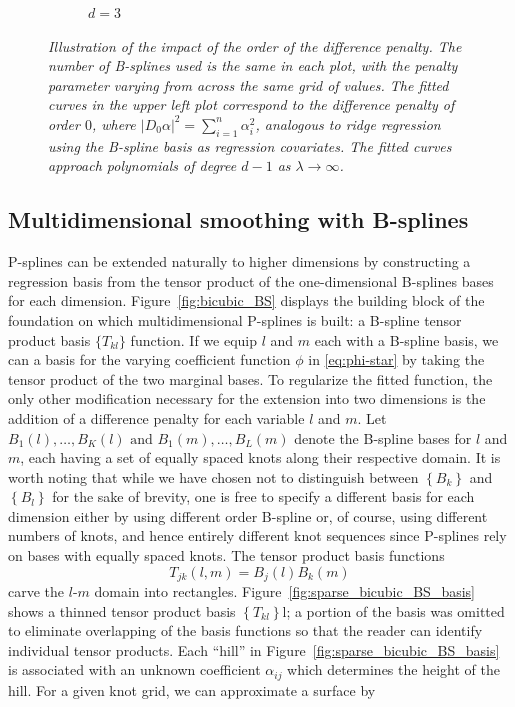 \documentclass[12pt]{article}
\theoremstyle{definition}
\begin{document}
\begin{figure}[H]
\begin{subfigure}{.5\textwidth}
\caption{$d=3$}
\end{subfigure}
\caption{\textit{Illustration of the impact of the order of the difference penalty. The number of B-splines used is the same in each plot, with the penalty parameter varying from across the same grid of values. The fitted curves in the upper left plot correspond to the difference penalty of order $0$, where $\vert D_0 \alpha \vert^2 = \sum_{i=1}^n \alpha_i^2$, analogous to ridge regression using the B-spline basis as regression covariates. The fitted curves approach polynomials of degree $d-1$ as $\lambda \rightarrow \infty$.}}
\label{fig:PS_penalty_section_figure_6}
\end{figure}


\subsection{Multidimensional smoothing with B-splines} \label{subsection:tensor-product-pspline-models}

P-splines can be extended naturally to higher dimensions by constructing a regression basis from the tensor product of the one-dimensional B-splines bases for each dimension. Figure~\ref{fig:bicubic_BS} displays the building block of the foundation on which multidimensional P-splines is built: a B-spline tensor product basis $\big\{ T_{kl}\big\}$ function.  If we equip $l$ and $m$ each with a B-spline basis, we can a basis for the varying coefficient function $\phi$ in \ref{eq:phi-star} by taking the tensor product of the two marginal bases. To regularize the fitted function, the only other modification necessary for the extension into two dimensions is the addition of a difference penalty for each variable $l$ and $m$. Let $B_{1}\left(l\right),\dots, B_{K}\left(l\right)  \mbox{ and } B_{1}\left(m\right),\dots, B_{L}\left(m\right)$  denote the B-spline bases for $l$ and $m$, each having a set of equally spaced knots along their respective domain. It is worth noting that while we have chosen not to distinguish between $\left\{ B_k \right\}$ and $\left\{ {B}_l \right\}$ for the sake of brevity, one is free to specify a different basis for each dimension either by using different order B-spline or, of course, using different numbers of knots, and hence entirely different knot sequences since P-splines rely on bases with equally spaced knots. The tensor product basis functions
\begin{equation*}
T_{jk}\left(l,m\right) = B_j\left(l\right){B}_k\left(m\right)
\end{equation*}
\noindent
 carve the $l$-$m$ domain into rectangles.  Figure~\ref{fig:sparse_bicubic_BS_basis} shows a thinned tensor product basis $\left\{ T_{kl} \right\}$l; a portion of the basis was omitted to eliminate overlapping of the basis functions so that the reader can identify individual tensor products. Each ``hill'' in Figure~\ref{fig:sparse_bicubic_BS_basis} is associated with an unknown coefficient $\alpha_{ij}$ which determines the height of the hill. For a given knot grid, we can approximate a surface by
\end{document}
